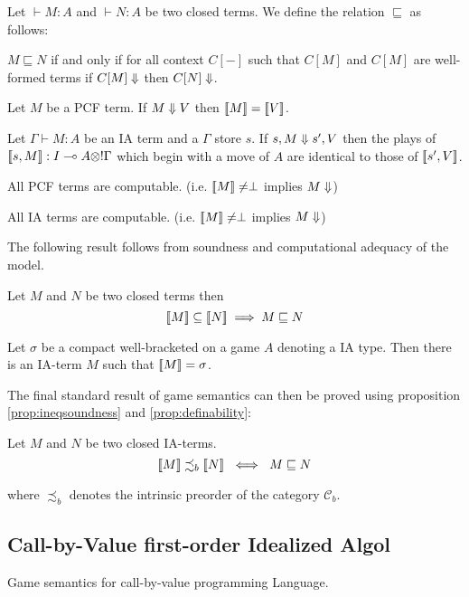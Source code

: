 \begin{dfn}
Let $\vdash M : A$ and $\vdash N : A$ be two closed terms. We define the relation $\sqsubseteq$ as follows:


$M \sqsubseteq N$ if and only if for all context $C[-]$ such that $C[M]$ and $C[M]$ are well-formed terms if
$C[M] \Downarrow$ then $C[N] \Downarrow$.
\end{dfn}


\begin{lem} Let $M$ be a PCF term.
If $M \Downarrow V$ then ${[\![ M ]\!]} = {[\![ V ]\!]}$.
\end{lem}

\begin{lem} Let $\Gamma \vdash M : A$ be an IA term and a $\Gamma$ store $s$.
If $s,M \Downarrow s',V$ then the plays of ${[\![ s,M ]\!]} : I \multimap A \otimes !\Gamma$ which begin
with a move of $A$ are identical to those of ${[\![ s',V ]\!]}$.
\end{lem}


\begin{lem}
All PCF terms are computable. (i.e. ${[\![ M ]\!]} \neq \perp$ implies $M \Downarrow$)
\end{lem}

\begin{lem}
All IA terms are computable. (i.e. ${[\![ M ]\!]} \neq \perp$ implies $M \Downarrow$)
\end{lem}


The following result follows from soundness and computational adequacy of the model.
\begin{prop}
\label{prop:ineqsoundness}
Let $M$ and $N$ be two closed terms then
$${[\![ M ]\!]} \subseteq {[\![N ]\!]} \implies  M \sqsubseteq N $$
\end{prop}

\begin{prop}[Definability]
\label{prop:definability}
Let $\sigma$ be a compact well-bracketed on a game $A$ denoting a IA type. Then there is
an IA-term $M$ such that ${[\![ M ]\!]} = \sigma$.
\end{prop}

The final standard result of game semantics can then be proved using proposition \ref{prop:ineqsoundness} and \ref{prop:definability}:
\begin{thm}
Let $M$ and $N$ be two closed IA-terms.
$${[\![ M ]\!]} \precsim_b {[\![ N ]\!]} \ \iff \ M \sqsubseteq N$$
\end{thm}

where $\precsim_b$ denotes the intrinsic preorder of the category $\mathcal{C}_b$.


\subsection{Call-by-Value first-order Idealized Algol}

Game semantics for call-by-value programming Language.
